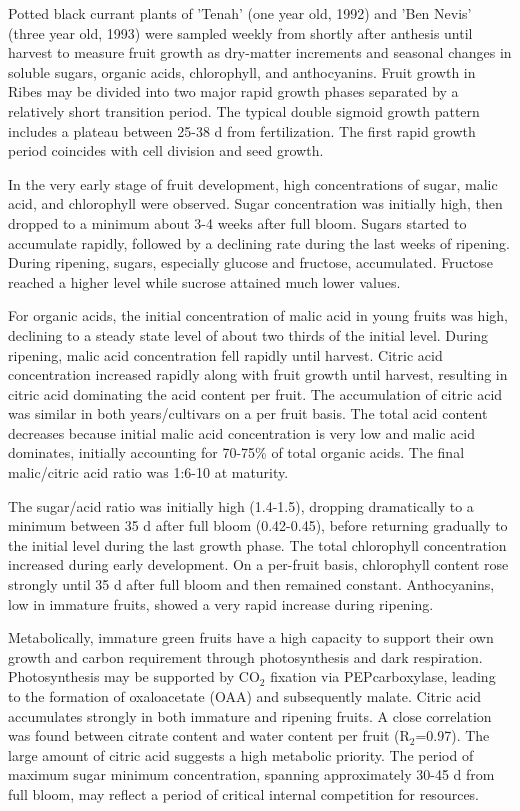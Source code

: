 Potted black currant plants of 'Tenah' (one year old, 1992) and 'Ben Nevis' (three year old, 1993) were sampled weekly from shortly after anthesis until harvest to measure fruit growth as dry-matter increments and seasonal changes in soluble sugars, organic acids, chlorophyll, and anthocyanins. Fruit growth in Ribes may be divided into two major rapid growth phases separated by a relatively short transition period. The typical double sigmoid growth pattern includes a plateau between 25-38 d from fertilization. The first rapid growth period coincides with cell division and seed growth.

\vspace{0.5em}
In the very early stage of fruit development, high concentrations of sugar, malic acid, and chlorophyll were observed. Sugar concentration was initially high, then dropped to a minimum about 3-4 weeks after full bloom. Sugars started to accumulate rapidly, followed by a declining rate during the last weeks of ripening. During ripening, sugars, especially glucose and fructose, accumulated. Fructose reached a higher level while sucrose attained much lower values.

\vspace{0.5em}
For organic acids, the initial concentration of malic acid in young fruits was high, declining to a steady state level of about two thirds of the initial level. During ripening, malic acid concentration fell rapidly until harvest. Citric acid concentration increased rapidly along with fruit growth until harvest, resulting in citric acid dominating the acid content per fruit. The accumulation of citric acid was similar in both years/cultivars on a per fruit basis. The total acid content decreases because initial malic acid concentration is very low and malic acid dominates, initially accounting for 70-75\% of total organic acids. The final malic/citric acid ratio was 1:6-10 at maturity.

\vspace{0.5em}
The sugar/acid ratio was initially high (1.4-1.5), dropping dramatically to a minimum between 35 d after full bloom (0.42-0.45), before returning gradually to the initial level during the last growth phase.
The total chlorophyll concentration increased during early development. On a per-fruit basis, chlorophyll content rose strongly until 35 d after full bloom and then remained constant. Anthocyanins, low in immature fruits, showed a very rapid increase during ripening.

\vspace{0.5em}
Metabolically, immature green fruits have a high capacity to support their own growth and carbon requirement through photosynthesis and dark respiration. Photosynthesis may be supported by CO$_2$ fixation via PEPcarboxylase, leading to the formation of oxaloacetate (OAA) and subsequently malate. Citric acid accumulates strongly in both immature and ripening fruits. A close correlation was found between citrate content and water content per fruit (R$_2$=0.97). The large amount of citric acid suggests a high metabolic priority. The period of maximum sugar minimum concentration, spanning approximately 30-45 d from full bloom, may reflect a period of critical internal competition for resources.


